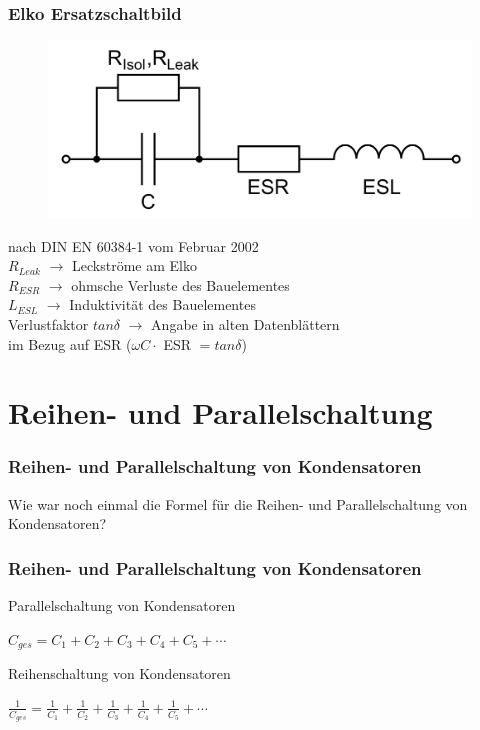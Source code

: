 \begin{frame}
  \frametitle{Elko Ersatzschaltbild}
  \begin{center}
    \begin{figure}
      \includegraphics[width=.8\textwidth,height=.3\textheight,keepaspectratio]{a03/Elko-Ersatzschaltbild.png}
    \end{figure}
    nach DIN EN 60384-1 vom Februar 2002 \\[1em]

    $R_{Leak}$ $\rightarrow$ Leckströme am Elko\\
    $R_{ESR}$ $\rightarrow$ ohmsche Verluste des Bauelementes\\
    $L_{ESL}$ $\rightarrow$ Induktivität des Bauelementes\\
    Verlustfaktor $tan \delta$ $\rightarrow$ Angabe in alten Datenblättern \\im Bezug auf ESR ($\omega C \cdot$ ESR $= tan \delta$)
  \end{center}
\end{frame}


\section*{Reihen- und Parallelschaltung}

\begin{frame}
  \frametitle{Reihen- und Parallelschaltung von Kondensatoren}
  \begin{center}
    \huge Wie war noch einmal die Formel für die Reihen- und Parallelschaltung von Kondensatoren?
  \end{center}
\end{frame}

\begin{frame}
  \frametitle{Reihen- und Parallelschaltung von Kondensatoren}
  \begin{block}{Parallelschaltung von Kondensatoren}
    \begin{center}
      \huge{$C_{ges} = C_{1} + C_{2} + C_{3} + C_{4} + C_{5} + \cdots$}
    \end{center}
  \end{block}
  \pause
  \begin{block}{Reihenschaltung von Kondensatoren}
    \begin{center}
      \huge{$\frac{1}{C_{ges}} = \frac{1}{ C_{1}} + \frac{1}{C_{2}} + \frac{1}{C_{3}} + \frac{1}{C_{4}} + \frac{1}{C_{5}} + \cdots$}
    \end{center}
  \end{block}
\end{frame}

